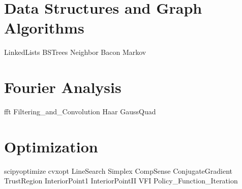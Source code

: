 \documentclass[nociteref]{SIAM-GH-book}
\begin{document}
\part{Data Structures and Graph Algorithms}
{LinkedLists}
{BSTrees}
{Neighbor}
{Bacon}
{Markov}

\part{Fourier Analysis}
{fft}
{Filtering_and_Convolution}
{Haar}
{GaussQuad}

\part{Optimization}
{scipyoptimize}
{cvxopt}
{LineSearch}
{Simplex}
{CompSense}
{ConjugateGradient}
{TrustRegion}
{InteriorPoint1}
{InteriorPointII}
{VFI}
{Policy_Function_Iteration}













\end{document}
